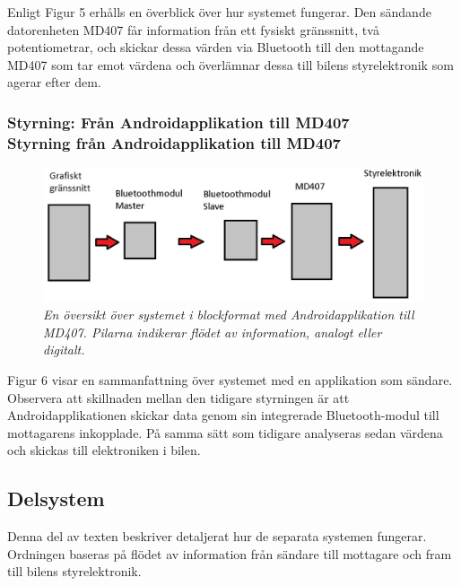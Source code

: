 \documentclass[a4paper]{article}
\begin{document}
Enligt Figur 5 erhålls en överblick över hur systemet fungerar. Den sändande datorenheten MD407 får information från ett fysiskt gränssnitt, två potentiometrar, och skickar dessa värden via Bluetooth till den mottagande MD407 som tar emot värdena och överlämnar dessa till bilens styrelektronik som agerar efter dem.

\subsubsection{Styrning: Från Androidapplikation till MD407 \\ Styrning från Androidapplikation till MD407}
\begin{figure}[H]
\includegraphics[width=\textwidth]{systemoversiktAndroid.jpg}
\centering
\caption{\it En översikt över systemet i blockformat med Androidapplikation till MD407. Pilarna indikerar flödet av information, analogt eller digitalt.}
\end{figure} 

Figur 6 visar en sammanfattning över systemet med en applikation som sändare. Observera att skillnaden mellan den tidigare styrningen är att Androidapplikationen skickar data genom sin integrerade Bluetooth-modul till mottagarens inkopplade. På samma sätt som tidigare analyseras sedan värdena och skickas till elektroniken i bilen.


\subsection{Delsystem}
Denna del av texten beskriver detaljerat hur de separata systemen fungerar. Ordningen baseras på flödet av information från sändare till mottagare och fram till bilens styrelektronik.
\end{document}
